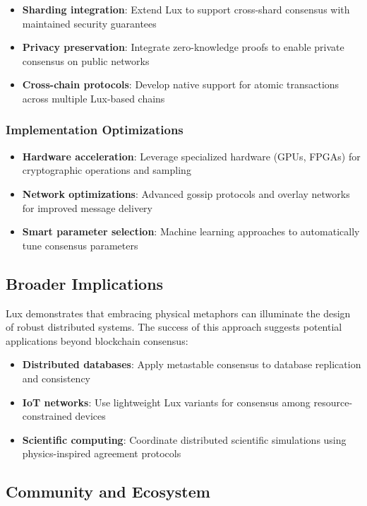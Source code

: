 \begin{itemize}
\item \textbf{Sharding integration}: Extend Lux to support cross-shard consensus with maintained security guarantees
\item \textbf{Privacy preservation}: Integrate zero-knowledge proofs to enable private consensus on public networks
\item \textbf{Cross-chain protocols}: Develop native support for atomic transactions across multiple Lux-based chains
\end{itemize}

\subsubsection{Implementation Optimizations}

\begin{itemize}
\item \textbf{Hardware acceleration}: Leverage specialized hardware (GPUs, FPGAs) for cryptographic operations and sampling
\item \textbf{Network optimizations}: Advanced gossip protocols and overlay networks for improved message delivery
\item \textbf{Smart parameter selection}: Machine learning approaches to automatically tune consensus parameters
\end{itemize}

\subsection{Broader Implications}

Lux demonstrates that embracing physical metaphors can illuminate the design of robust distributed systems. The success of this approach suggests potential applications beyond blockchain consensus:

\begin{itemize}
\item \textbf{Distributed databases}: Apply metastable consensus to database replication and consistency
\item \textbf{IoT networks}: Use lightweight Lux variants for consensus among resource-constrained devices  
\item \textbf{Scientific computing}: Coordinate distributed scientific simulations using physics-inspired agreement protocols
\end{itemize}

\subsection{Community and Ecosystem}

